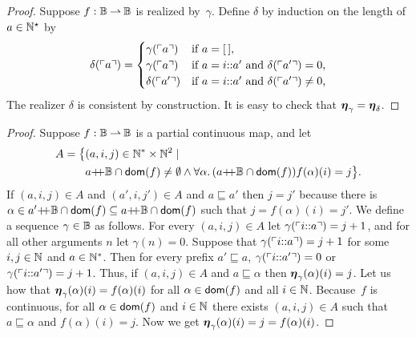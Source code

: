 \begin{proof}
  Suppose $f : \mathbb{B} \mathbin{\rightharpoonup} \mathbb{B}$ is realized by~$\gamma$. Define
  $\delta$ by induction on the length of $a \in \mathbb{N}^{\star}$ by
  \begin{equation*}
    \delta(\ulcorner a \urcorner) =
    \begin{cases}
      \gamma(\ulcorner a \urcorner) & \text{if $a = [\,]$,}\\
      \gamma(\ulcorner a \urcorner) & \text{if $a = i {:}{:} a'$ and
        $\delta(\ulcorner a' \urcorner) = 0$,}\\
      \delta(\ulcorner a' \urcorner) & \text{if $a = i {:}{:} a'$ and
        $\delta(\ulcorner a' \urcorner) \neq 0$,}
    \end{cases}
  \end{equation*}
  The realizer $\delta$ is consistent by construction. It is easy to check that $\text{\boldmath{$\eta$}}_\gamma = \text{\boldmath{$\eta$}}_\delta$.
\end{proof}


\begin{proof}
  Suppose $f: \mathbb{B} \mathbin{\rightharpoonup} \mathbb{B}$ is a partial continuous map, and let
  \begin{align*}
     A = \big\{ & (a, i, j) \in \mathbb{N}^{*} \times \mathbb{N}^{2} \mid \\
       &a{{+}\!\!{+}}\mathbb{B} \cap \mathsf{dom}(f) \neq \emptyset \land
        \forall \alpha .\,{(a{{+}\!\!{+}}\mathbb{B} \cap \mathsf{dom}(f))}{
          f(\alpha)(i) = j
          }
        \big\}.
  \end{align*}
  If $(a, i, j) \in A$ and $(a', i, j') \in A$ and $a \sqsubseteq a'$
  then $j = j'$ because there is $\alpha \in a'{{+}\!\!{+}}\mathbb{B} \cap
  \mathsf{dom}(f) \subseteq a{{+}\!\!{+}}\mathbb{B} \cap \mathsf{dom}(f)$ such that $j =
  f(\alpha)(i) = j'$. We define a sequence $\gamma \in \mathbb{B}$ as
  follows. For every $(a, i, j) \in A$ let
  $\gamma(\ulcorner i {:}{:} a \urcorner) = j + 1$, and for all other
  arguments $n$ let $\gamma(n) = 0$. Suppose that
  $\gamma(\ulcorner i {:}{:} a \urcorner) = j + 1$ for some $i, j \in \mathbb{N}$
  and $a \in \mathbb{N}^{*}$. Then for every prefix $a' \sqsubseteq a$,
  $\gamma(\ulcorner i {:}{:} a' \urcorner) = 0$ or
  $\gamma(\ulcorner i {:}{:} a' \urcorner) = j + 1$. Thus, if $(a, i, j) \in
  A$ and $a \sqsubseteq \alpha$ then $\text{\boldmath{$\eta$}}_{\gamma}(\alpha)(i) = j$.
  Let us how that $\text{\boldmath{$\eta$}}_{\gamma}(\alpha)(i) = f(\alpha)(i)$ for all
  $\alpha \in \mathsf{dom}(f)$ and all $i \in \mathbb{N}$. Because~$f$ is continuous,
  for all $\alpha \in \mathsf{dom}(f)$ and $i \in \mathbb{N}$ there exists $(a, i, j)
  \in A$ such that $a \sqsubseteq \alpha$ and $f(\alpha)(i) = j$. Now
  we get
  $
    \text{\boldmath{$\eta$}}_{\gamma}(\alpha)(i)
    = j
    = f(\alpha)(i)
  $.
\end{proof}

